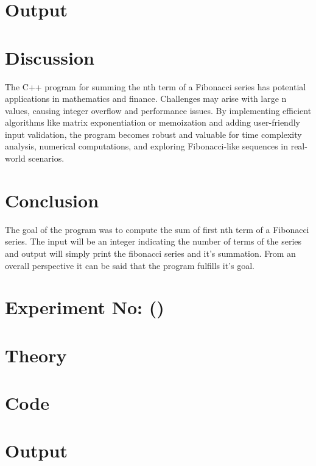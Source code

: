 \documentclass{report}
\newcounter{exp_no}
\begin{document}
\section*{Output}
\begin{tcolorbox}[colback=black, coltext=white, fontupper=\ttfamily\small,sharp corners ]
    
\end{tcolorbox}

\section*{Discussion}
The C++ program for summing the nth term of a Fibonacci series has potential applications in mathematics and finance. Challenges may arise with large n values, causing integer overflow and performance issues. By implementing efficient algorithms like matrix exponentiation or memoization and adding user-friendly input validation, the program becomes robust and valuable for time complexity analysis, numerical computations, and exploring Fibonacci-like sequences in real-world scenarios.

\section*{Conclusion}
The goal of the program was to  compute the sum of first nth term of a Fibonacci series. The input will be an integer indicating the number of terms of the series and output will simply print the fibonacci series and it's summation. From an  overall perspective it can be said that the program fulfills it's goal.

\section*{Experiment No:  \thechapter ()}

\section*{Theory}


\section*{Code}


\section*{Output}
\begin{tcolorbox}[colback=black, coltext=white, fontupper=\ttfamily\small,sharp corners ]
    
\end{tcolorbox}
\begin{tcolorbox}[colback=black, coltext=white, fontupper=\ttfamily\small,sharp corners ]
    
\end{tcolorbox}
\end{document}
